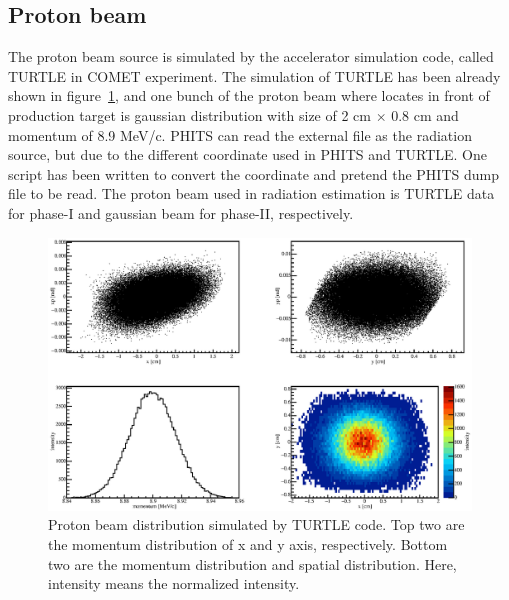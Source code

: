  \subsection{Proton beam}
The proton beam source is simulated by the accelerator simulation code, called TURTLE in COMET experiment.
The simulation of TURTLE has been already shown in figure~\ref{beam}, and one bunch of the proton beam where locates in front of production target is gaussian distribution with size of 2 cm $\times$ 0.8 cm and momentum of 8.9 MeV/c.
PHITS can read the external file as the radiation source, but due to the different coordinate used in PHITS and TURTLE.
One script has been written to convert the coordinate and pretend the PHITS dump file to be read. 
The proton beam used in radiation estimation is TURTLE data for phase-I and gaussian beam for phase-II, respectively.
\begin{figure}[H]
 \centering
 \includegraphics[scale=0.5]{chapter3/fig/beam.eps}
 \caption{Proton beam distribution simulated by TURTLE code. Top two are the momentum distribution of x and y axis, respectively. Bottom two are the momentum distribution and spatial distribution. Here, intensity means the normalized intensity.}
 \label{beam}
\end{figure}
 
